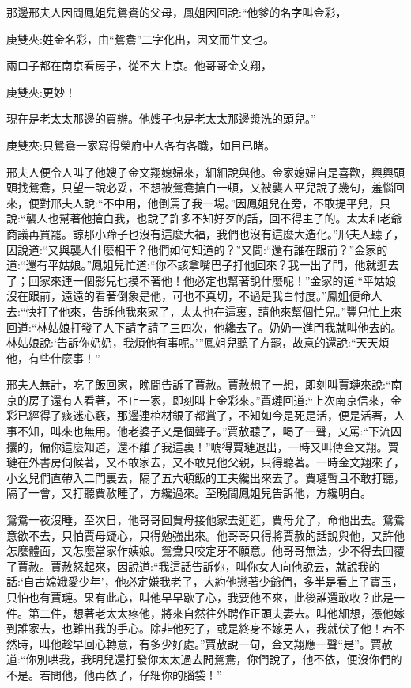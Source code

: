 \begin{parag}
    那邊邢夫人因問鳳姐兒鴛鴦的父母，鳳姐因回說:“他爹的名字叫金彩，\begin{note}庚雙夾:姓金名彩，由“鴛鴦”二字化出，因文而生文也。\end{note}兩口子都在南京看房子，從不大上京。他哥哥金文翔，\begin{note}庚雙夾:更妙！\end{note}現在是老太太那邊的買辦。他嫂子也是老太太那邊漿洗的頭兒。”\begin{note}庚雙夾:只鴛鴦一家寫得榮府中人各有各職，如目已睹。\end{note}邢夫人便令人叫了他嫂子金文翔媳婦來，細細說與他。金家媳婦自是喜歡，興興頭頭找鴛鴦，只望一說必妥，不想被鴛鴦搶白一頓，又被襲人平兒說了幾句，羞惱回來，便對邢夫人說:“不中用，他倒罵了我一場。”因鳳姐兒在旁，不敢提平兒，只說:“襲人也幫著他搶白我，也說了許多不知好歹的話，回不得主子的。太太和老爺商議再買罷。諒那小蹄子也沒有這麼大福，我們也沒有這麼大造化。”邢夫人聽了，因說道:“又與襲人什麼相干？他們如何知道的？”又問:“還有誰在跟前？”金家的道:“還有平姑娘。”鳳姐兒忙道:“你不該拿嘴巴子打他回來？我一出了門，他就逛去了；回家來連一個影兒也摸不著他！他必定也幫著說什麼呢！”金家的道:“平姑娘沒在跟前，遠遠的看著倒象是他，可也不真切，不過是我白忖度。”鳳姐便命人去:“快打了他來，告訴他我來家了，太太也在這裏，請他來幫個忙兒。”豐兒忙上來回道:“林姑娘打發了人下請字請了三四次，他纔去了。奶奶一進門我就叫他去的。林姑娘說:‘告訴你奶奶，我煩他有事呢。’”鳳姐兒聽了方罷，故意的還說:“天天煩他，有些什麼事！”
\end{parag}


\begin{parag}
    邢夫人無計，吃了飯回家，晚間告訴了賈赦。賈赦想了一想，即刻叫賈璉來說:“南京的房子還有人看著，不止一家，即刻叫上金彩來。”賈璉回道:“上次南京信來，金彩已經得了痰迷心竅，那邊連棺材銀子都賞了，不知如今是死是活，便是活著，人事不知，叫來也無用。他老婆子又是個聾子。”賈赦聽了，喝了一聲，又罵:“下流囚攮的，偏你這麼知道，還不離了我這裏！”唬得賈璉退出，一時又叫傳金文翔。賈璉在外書房伺候著，又不敢家去，又不敢見他父親，只得聽著。一時金文翔來了，小幺兒們直帶入二門裏去，隔了五六頓飯的工夫纔出來去了。賈璉暫且不敢打聽，隔了一會，又打聽賈赦睡了，方纔過來。至晚間鳳姐兒告訴他，方纔明白。
\end{parag}


\begin{parag}
    鴛鴦一夜沒睡，至次日，他哥哥回賈母接他家去逛逛，賈母允了，命他出去。鴛鴦意欲不去，只怕賈母疑心，只得勉強出來。他哥哥只得將賈赦的話說與他，又許他怎麼體面，又怎麼當家作姨娘。鴛鴦只咬定牙不願意。他哥哥無法，少不得去回覆了賈赦。賈赦怒起來，因說道:“我這話告訴你，叫你女人向他說去，就說我的話:‘自古嫦娥愛少年’，他必定嫌我老了，大約他戀著少爺們，多半是看上了寶玉，只怕也有賈璉。果有此心，叫他早早歇了心，我要他不來，此後誰還敢收？此是一件。第二件，想著老太太疼他，將來自然往外聘作正頭夫妻去。叫他細想，憑他嫁到誰家去，也難出我的手心。除非他死了，或是終身不嫁男人，我就伏了他！若不然時，叫他趁早回心轉意，有多少好處。”賈赦說一句，金文翔應一聲“是”。賈赦道:“你別哄我，我明兒還打發你太太過去問鴛鴦，你們說了，他不依，便沒你們的不是。若問他，他再依了，仔細你的腦袋！”
\end{parag}


